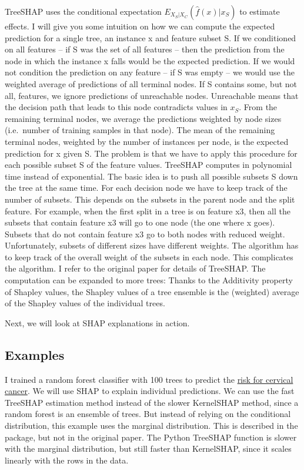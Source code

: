 \documentclass[
  10pt,
]{scrbook}
\begin{document}
TreeSHAP uses the conditional expectation \(E_{X_S|X_C}(\hat{f}(x)|x_S)\) to estimate effects.
I will give you some intuition on how we can compute the expected prediction for a single tree, an instance x and feature subset S.
If we conditioned on all features -- if S was the set of all features -- then the prediction from the node in which the instance x falls would be the expected prediction.
If we would not condition the prediction on any feature -- if S was empty -- we would use the weighted average of predictions of all terminal nodes.
If S contains some, but not all, features, we ignore predictions of unreachable nodes.
Unreachable means that the decision path that leads to this node contradicts values in \(x_S\).
From the remaining terminal nodes, we average the predictions weighted by node sizes (i.e.~number of training samples in that node).
The mean of the remaining terminal nodes, weighted by the number of instances per node, is the expected prediction for x given S.
The problem is that we have to apply this procedure for each possible subset S of the feature values.
TreeSHAP computes in polynomial time instead of exponential.
The basic idea is to push all possible subsets S down the tree at the same time.
For each decision node we have to keep track of the number of subsets.
This depends on the subsets in the parent node and the split feature.
For example, when the first split in a tree is on feature x3, then all the subsets that contain feature x3 will go to one node (the one where x goes).
Subsets that do not contain feature x3 go to both nodes with reduced weight.
Unfortunately, subsets of different sizes have different weights.
The algorithm has to keep track of the overall weight of the subsets in each node.
This complicates the algorithm.
I refer to the original paper for details of TreeSHAP.
The computation can be expanded to more trees:
Thanks to the Additivity property of Shapley values, the Shapley values of a tree ensemble is the (weighted) average of the Shapley values of the individual trees.

Next, we will look at SHAP explanations in action.

\hypertarget{examples-5}{%
\subsection{Examples}\label{examples-5}}

I trained a random forest classifier with 100 trees to predict the \protect\hyperlink{cervical}{risk for cervical cancer}.
We will use SHAP to explain individual predictions.
We can use the fast TreeSHAP estimation method instead of the slower KernelSHAP method, since a random forest is an ensemble of trees.
But instead of relying on the conditional distribution, this example uses the marginal distribution.
This is described in the package, but not in the original paper.
The Python TreeSHAP function is slower with the marginal distribution, but still faster than KernelSHAP, since it scales linearly with the rows in the data.
\end{document}
